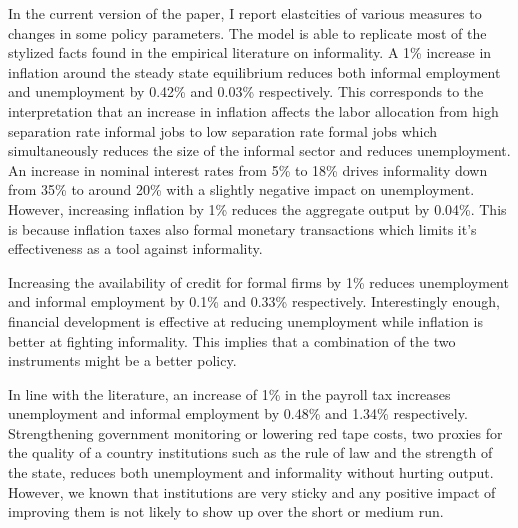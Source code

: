 \documentclass[12pt,a4paper,titlepage]{article}
\begin{document}
In the current version of the paper, I report elastcities of various measures to changes in some policy parameters. The model is able to replicate most of the stylized facts found in the empirical literature on informality. A 1\% increase in inflation around the steady state equilibrium reduces both informal employment and unemployment by 0.42\% and 0.03\% respectively. This corresponds to the interpretation that an increase in inflation affects the labor allocation from high separation rate informal jobs to low separation rate formal jobs which simultaneously reduces the size of the informal sector and reduces unemployment. An increase in nominal interest rates from 5\% to 18\% drives informality down from 35\% to around 20\% with a slightly negative impact on unemployment. However, increasing inflation by 1\% reduces the aggregate output by 0.04\%. This is because inflation taxes also formal monetary transactions which limits it's effectiveness as a tool against informality.

Increasing the availability of credit for formal firms by 1\% reduces unemployment and informal employment by 0.1\% and 0.33\% respectively. Interestingly enough, financial development is effective at reducing unemployment while inflation is better at fighting informality. This implies that a combination of the two instruments might be a better policy.

In line with the literature, an increase of 1\% in the payroll tax increases unemployment and informal employment by 0.48\% and 1.34\% respectively. Strengthening government monitoring or lowering red tape costs, two proxies for the quality of a country institutions such as the rule of law and the strength of the state, reduces both unemployment and informality without hurting output. However, we known that institutions are very sticky and any positive impact of improving them is not likely to show up over the short or medium run.
\end{document}
